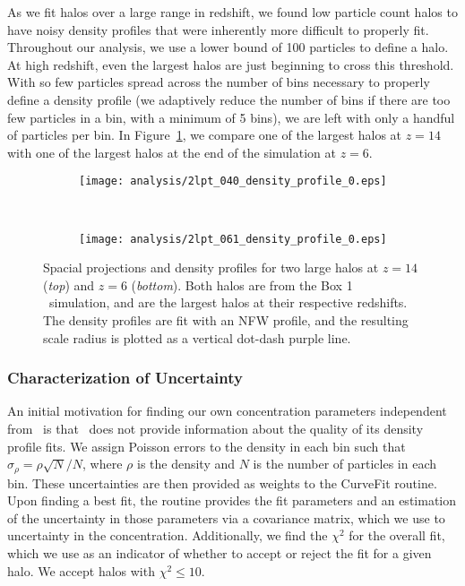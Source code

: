As we fit halos over a large range in redshift, we found low particle count halos to have noisy density profiles that were inherently more difficult to properly fit.  Throughout our analysis, we use a lower bound of 100 particles to define a halo.  At high redshift, even the largest halos are just beginning to cross this threshold.  With so few particles spread across the number of bins necessary to properly define a density profile (we adaptively reduce the number of bins if there are too few particles in a bin, with a minimum of 5 bins), we are left with only a handful of particles per bin.  In Figure~\ref{fig:fitting--density_profiles}, we compare one of the largest halos at $z = 14$ with one of the largest halos at the end of the simulation at $z = 6$.

\begin{figure}[tp]
	\centering
	\begin{subfigure}{}
		\texttt{[image: analysis/2lpt\_040\_density\_profile\_0.eps]}
	\end{subfigure}
	\\
	\begin{subfigure}{}
		\texttt{[image: analysis/2lpt\_061\_density\_profile\_0.eps]}
	\end{subfigure}
	\caption[Density profiles for two large halos at $z = 14$ and $z = 6$.]{\footnotesize Spacial projections and density profiles for two large halos at $z = 14$ (\emph{top}) and $z = 6$ (\emph{bottom}).  Both halos are from the Box 1 \lpt\ simulation, and are the largest halos at their respective redshifts.  The density profiles are fit with an NFW profile, and the resulting scale radius is plotted as a vertical dot-dash purple line.}
	\label{fig:fitting--density_profiles}
\end{figure}



\subsubsection{Characterization of Uncertainty}
\label{subsubsec:analysis--profile_fitting--uncertainty}


An initial motivation for finding our own concentration parameters independent from \rockstar\ is that \rockstar\ does not provide information about the quality of its density profile fits.  We assign Poisson errors to the density in each bin such that $\sigma_{\rho} = \rho \sqrt{N} / N$, where $\rho$ is the density and $N$ is the number of particles in each bin.  These uncertainties are then provided as weights to the CurveFit routine.  Upon finding a best fit, the routine provides the fit parameters and an estimation of the uncertainty in those parameters via a covariance matrix, which we use to uncertainty in the concentration.  Additionally, we find the $\chi^{2}$ for the overall fit, which we use as an indicator of whether to accept or reject the fit for a given halo.  We accept halos with $\chi^{2} \le 10$.



